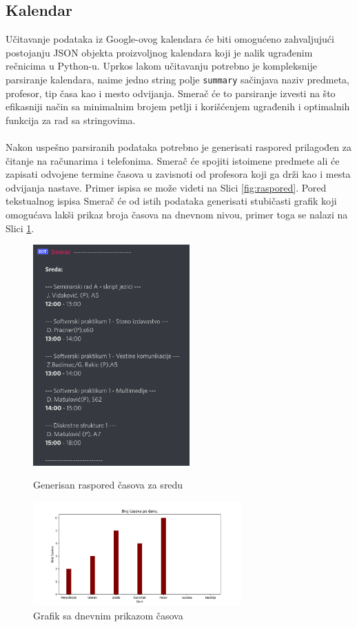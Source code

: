 \documentclass[a4paper,11pt]{article}
\begin{document}
\subsection{Kalendar}
Učitavanje podataka iz Google-ovog kalendara će biti omogućeno zahvaljujući postojanju JSON objekta proizvoljnog kalendara koji je nalik ugrađenim rečnicima u Python-u. Uprkos lakom učitavanju potrebno je kompleksnije parsiranje kalendara, naime jedno string polje \texttt{summary} sačinjava naziv predmeta, profesor, tip časa kao i mesto odvijanja. Smerač će to parsiranje izvesti na što efikasniji način sa minimalnim brojem petlji i korišćenjem ugrađenih i optimalnih funkcija za rad sa stringovima.
\\\\
Nakon uspešno parsiranih podataka potrebno je generisati raspored prilagođen za čitanje na računarima i telefonima. Smerač će spojiti istoimene predmete ali će zapisati odvojene termine časova u zavisnoti od profesora koji ga drži kao i mesta odvijanja nastave. Primer ispisa se može videti na Slici \ref{fig:raspored}. Pored tekstualnog ispisa Smerač će od istih podataka generisati stubičasti grafik koji omogućava lakši prikaz broja časova na dnevnom nivou, primer toga se nalazi na Slici \ref{fig:grafik}.
\vfill
\begin{figure}[!htb]
   \begin{minipage}{0.48\textwidth}
     \centering
     \includegraphics[width=6cm]{sreda}
     \caption{Generisan raspored časova za sredu}
     \label{fig:raspored}
   \end{minipage}\hfill
   \begin{minipage}{0.48\textwidth}
     \centering
     \includegraphics[width=8cm]{it}
     \caption{Grafik sa dnevnim prikazom časova}
     \label{fig:grafik}
   \end{minipage}
\end{figure}
\vfill
\newpage
\end{document}
